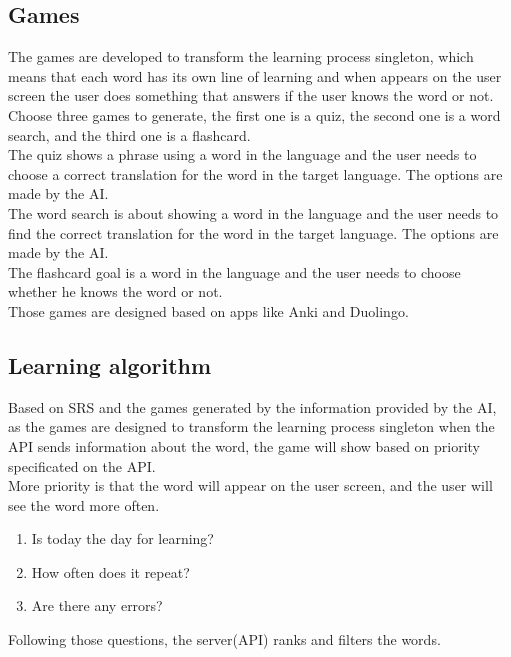 \documentclass[12pt]{article}
\begin{document}
\subsection{Games}
  The games are developed to transform the learning process singleton, which means that each word has its own line of learning and when appears on the user screen the user does something that answers if the user knows the word or not. \\
  Choose three games to generate, the first one is a quiz, the second one is a word search, and the third one is a flashcard. \\
  The quiz shows a phrase using a word in the language and the user needs to choose a correct translation for the word in the target language. The options are made by the AI. \\
  The word search is about showing a word in the language and the user needs to find the correct translation for the word in the target language. The options are made by the AI. \\
  The flashcard goal is a word in the language and the user needs to choose whether he knows the word or not. \\
  Those games are designed based on apps like Anki and Duolingo.
\subsection{Learning algorithm}
Based on SRS and the games generated by the information provided by the AI, as the games are designed to transform the learning process singleton when the API sends information about the word, the game will show based on priority specificated on the API. \\
More priority is that the word will appear on the user screen, and the user will see the word more often. \\
\begin{enumerate}
  \item Is today the day for learning?
  \item How often does it repeat? 
  \item Are there any errors?
\end{enumerate}
Following those questions, the server(API) ranks and filters the words. 
\end{document}
